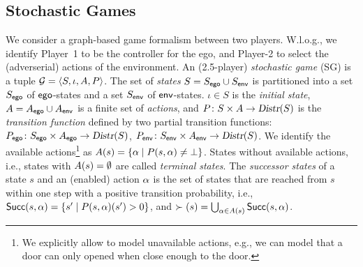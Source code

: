 \subsection{Stochastic Games}
We consider a graph-based game formalism between two players. W.l.o.g., we identify Player~1 to be the controller for the ego, and Player-2 to select the (adverserial) actions of the environment. 
An (2.5-player) \emph{stochastic game} (SG) is a tuple $\mathcal{G} = \langle S, \iota, A, P \rangle$. 
The set of \emph{states} $S = S_{\mathsf{ego}} \cup S_{\mathsf{env}}$ is partitioned into a set $S_{\mathsf{ego}}$ of $\mathsf{ego}$-states and a set $S_{\mathsf{env}}$ of $\mathsf{env}$-states. $\iota \in S$ is the \emph{initial state}, $A = A_{\mathsf{ego}} \cup A_{\mathsf{env}}$ is a finite set of \emph{actions}, and $P\colon S \times A \rightarrow \textsl{Distr}(S)$ is the \emph{transition function} defined by two partial transition functions: $P_{\mathsf{ego}}\colon S_{\mathsf{ego}} \times A_{\mathsf{ego}} \rightarrow \textsl{Distr}(S)$, $P_{\mathsf{env}}\colon S_{\mathsf{env}} \times A_{\mathsf{env}} \rightarrow \textsl{Distr}(S)$. We identify the available actions\footnote{We explicitly allow to model unavailable actions, e.g., we can model that a door can only opened when close enough to the door.} as $A(s) = \{ \alpha  \mid P(s,\alpha) \neq \bot \}$. States without available actions, i.e., states with $A(s) = \emptyset$ are called \emph{terminal states}. The \emph{successor states} of a state $s$ and an (enabled) action $\alpha$ is the set of states that are reached from $s$ within one step with a positive transition probability, i.e., $\mathsf{Succ}(s,\alpha) = \{ s' \mid P(s,\alpha)(s')>0 \}$, and $\succ(s) = \bigcup_{\alpha \in A(s)} \mathsf{Succ}(s,\alpha)$.


